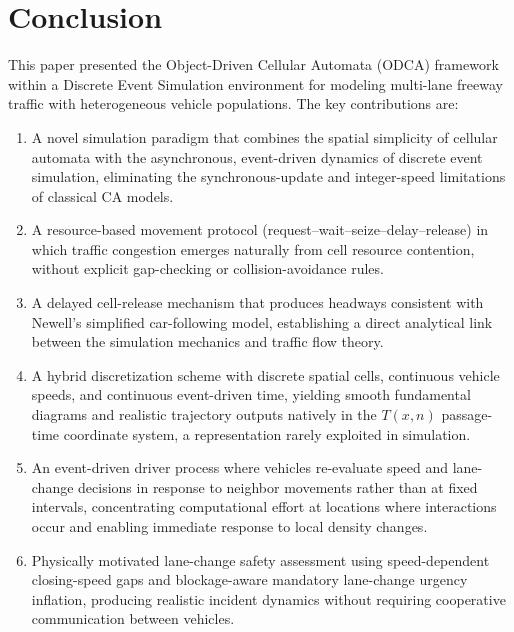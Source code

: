 \documentclass[review,authoryear]{elsarticle}
\begin{document}
\section{Conclusion}
\label{sec:conclusion}

This paper presented the Object-Driven Cellular Automata (ODCA) framework within a Discrete Event Simulation environment for modeling multi-lane freeway traffic with heterogeneous vehicle populations. The key contributions are:

\begin{enumerate}
    \item A novel simulation paradigm that combines the spatial simplicity of cellular automata with the asynchronous, event-driven dynamics of discrete event simulation, eliminating the synchronous-update and integer-speed limitations of classical CA models.

    \item A resource-based movement protocol (request--wait--seize--delay--release) in which traffic congestion emerges naturally from cell resource contention, without explicit gap-checking or collision-avoidance rules.

    \item A delayed cell-release mechanism that produces headways consistent with Newell's simplified car-following model, establishing a direct analytical link between the simulation mechanics and traffic flow theory.

    \item A hybrid discretization scheme with discrete spatial cells, continuous vehicle speeds, and continuous event-driven time, yielding smooth fundamental diagrams and realistic trajectory outputs natively in the $T(x,n)$ passage-time coordinate system, a representation rarely exploited in simulation.

    \item An event-driven driver process where vehicles re-evaluate speed and lane-change decisions in response to neighbor movements rather than at fixed intervals, concentrating computational effort at locations where interactions occur and enabling immediate response to local density changes.

    \item Physically motivated lane-change safety assessment using speed-dependent closing-speed gaps and blockage-aware mandatory lane-change urgency inflation, producing realistic incident dynamics without requiring cooperative communication between vehicles.


\end{enumerate}
\end{document}

